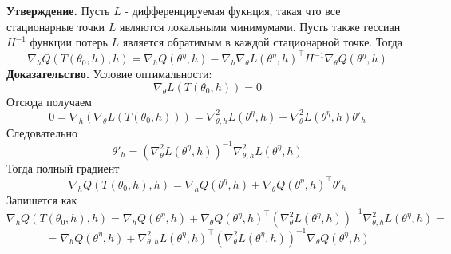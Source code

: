 \documentclass[12pt]{article}
\begin{document}
\noindent\textbf{Утверждение.}
Пусть $L$ - дифференцируемая фукнция, такая что все стационарные точки $L$ являются локальными минимумами. Пусть также гессиан $H^{-1}$ функции потерь $L$ является обратимым в каждой стационарной точке. Тогда
$$\nabla_hQ(T(\theta_0, h),h)=\nabla_hQ(\theta^{\eta}, h) - \nabla_h\nabla_\theta L(\theta^\eta,h)^\top H^{-1}\nabla_\theta Q(\theta^\eta, h)$$
\noindent\textbf{Доказательство.}
Условие оптимальности:
$$\nabla_\theta L(T(\theta_0, h)) = 0$$
Отсюда получаем
$$0 = \nabla_h\left(\nabla_\theta L(T(\theta_0, h))\right) = \nabla^2_{\theta,h}L(\theta^\eta, h) + \nabla^2_\theta L(\theta^\eta, h)\theta'_h$$
Следовательно
$$\theta'_h = (\nabla^2_\theta L(\theta^\eta, h))^{-1}\nabla^2_{\theta,h}L(\theta^\eta, h)$$
Тогда полный градиент
$$\nabla_hQ(T(\theta_0, h), h) = \nabla_hQ(\theta^{\eta}, h) + \nabla_\theta Q(\theta^\eta, h)^\top\theta'_h$$
Запишется как
$$\nabla_hQ(T(\theta_0, h), h) = \nabla_hQ(\theta^{\eta}, h) + \nabla_\theta Q(\theta^\eta, h)^\top(\nabla^2_\theta L(\theta^\eta, h))^{-1}\nabla^2_{\theta,h}L(\theta^\eta, h) = $$
$$ = \nabla_hQ(\theta^{\eta}, h) + \nabla^2_{\theta,h}L(\theta^\eta, h)^\top(\nabla^2_\theta L(\theta^\eta, h))^{-1}\nabla_\theta Q(\theta^\eta, h)$$
\end{document}
